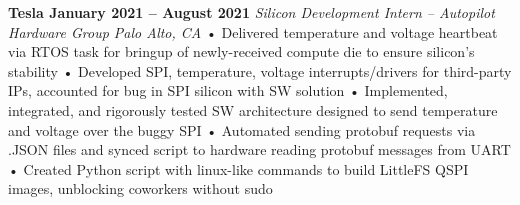 \documentclass[../main.tex]{subfiles}
\begin{document}
%
\noindent\textbf{{\fontsize{\textFontSize}{\textFontBox}\selectfont Tesla \hfill January 2021 – August 2021}}
\vspace{1mm}\newline
%
%
{\fontsize{\textFontSize}{\textFontBox}\selectfont\emph{Silicon Development Intern – Autopilot Hardware Group \hfill Palo Alto, CA \hspace{0 cm}}}
\vspace{-0mm}\newline
%
%
{\fontsize{\textFontSize}{\textFontBox}\selectfont • \hspace{1mm} Delivered temperature and voltage heartbeat via RTOS task for bringup of newly-received compute die to ensure silicon's stability }\newline
{\fontsize{\textFontSize}{\textFontBox}\selectfont • \hspace{1mm} Developed SPI, temperature, voltage interrupts/drivers for third-party IPs, accounted for bug in SPI silicon with SW solution }\newline
{\fontsize{\textFontSize}{\textFontBox}\selectfont • \hspace{1mm} Implemented, integrated, and rigorously tested SW architecture designed to send temperature and voltage over the buggy SPI }\newline
{\fontsize{\textFontSize}{\textFontBox}\selectfont • \hspace{1mm} Automated sending protobuf requests via .JSON files and synced script to hardware reading protobuf messages from UART }\newline
{\fontsize{\textFontSize}{\textFontBox}\selectfont • \hspace{1mm} Created Python script with linux-like commands to build LittleFS QSPI images, unblocking coworkers without sudo }\newline
\vspace{-7mm}\newline
%
%
\end{document}
